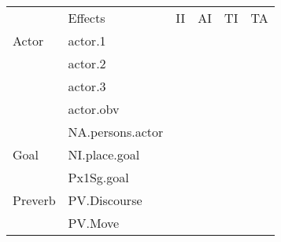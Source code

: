 \begin{table}[]
\begin{tabular}{@{}llllll@{}}
\toprule
               & Effects          & II                                                 & AI                                                   & TI                                                   & TA                                                   \\
Actor          & actor.1          &                                                    & \cellcolor[HTML]{B6D7A8}{ IND}   &                                                      & \cellcolor[HTML]{B6D7A8}{ IND}   \\
               & actor.2          &                                                    & \cellcolor[HTML]{B6D7A8}{ IND}   & \cellcolor[HTML]{B6D7A8}{ IND}   & \cellcolor[HTML]{B6D7A8}{ IND}   \\
               & actor.3          &                                                    &                                                      & \cellcolor[HTML]{EA9999}{ ê-CNJ} &                                                      \\
               & actor.obv        &                                                    &                                                      &                                                      & \cellcolor[HTML]{EA9999}{ ê-CNJ} \\
               & NA.persons.actor &                                                    &                                                      & \cellcolor[HTML]{B6D7A8}{ IND}   &                                                      \\
\midrule
Goal           & NI.place.goal    &                                                    &                                                      & \cellcolor[HTML]{EA9999}{ ê-CNJ} &                                                      \\
               & Px1Sg.goal       &                                                    &                                                      & \cellcolor[HTML]{B6D7A8}{ IND}   &                                                      \\
\midrule
Preverb        & PV.Discourse     &                                                    & \cellcolor[HTML]{EA9999}{ ê-CNJ} & \cellcolor[HTML]{EA9999}{ ê-CNJ} & \cellcolor[HTML]{EA9999}{ ê-CNJ} \\
               & PV.Move          &                                                    &                                                      &                                                      & \cellcolor[HTML]{EA9999}{ ê-CNJ} \\

\end{tabular}
\end{table}
